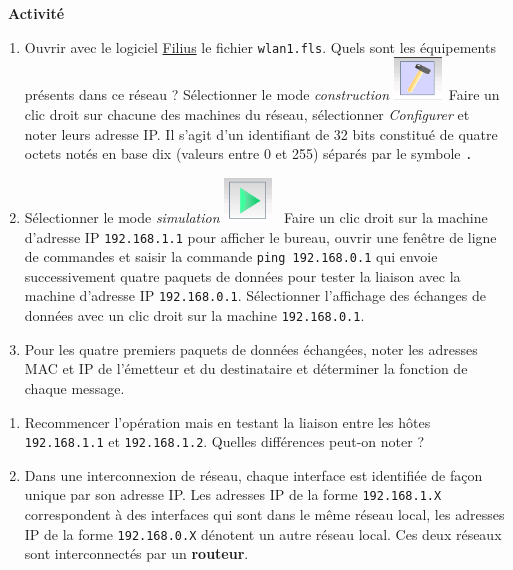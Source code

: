 \documentclass[
  11pt,
]{article}
\newcommand{\passthrough}[1]{#1}
\newcounter{activite}
\newenvironment{activite}[1]
{\par \medskip   \noindent   \addtocounter{activite}{1}
\begin{bclogo}[arrondi =0.1,   noborder = true, logo=\bcvelo, marge=4]{~\textbf{Activité} \textbf{\theactivite} {\itshape #1} }  \par}
{
\end{bclogo}
 \par \bigskip }
\newcounter{def}
\newcounter{logi}
\begin{document}
\begin{activite}{}

\begin{enumerate}
\def\labelenumi{\arabic{enumi}.}
\item
  Ouvrir avec le logiciel
  \href{https://www.lernsoftware-filius.de/Herunterladen}{Filius} le
  fichier \passthrough{\lstinline!wlan1.fls!}. Quels sont les
  équipements présents dans ce réseau ? Sélectionner le mode
  \emph{construction}
  \includegraphics[width=0.1\textwidth,height=\textheight]{images/filius-construction.png}~Faire
  un clic droit sur chacune des machines du réseau, sélectionner
  \emph{Configurer} et noter leurs adresse IP. Il s'agit d'un
  identifiant de 32 bits constitué de quatre octets notés en base dix
  (valeurs entre 0 et 255) séparés par le symbole
  \passthrough{\lstinline!.!}
\item
  Sélectionner le mode \emph{simulation}
  \includegraphics[width=0.1\textwidth,height=\textheight]{images/filius-simulation.png}~
  Faire un clic droit sur la machine d'adresse IP
  \passthrough{\lstinline!192.168.1.1!} pour afficher le bureau, ouvrir
  une fenêtre de ligne de commandes et saisir la commande
  \passthrough{\lstinline!ping 192.168.0.1!} qui envoie successivement
  quatre paquets de données pour tester la liaison avec la machine
  d'adresse IP \passthrough{\lstinline!192.168.0.1!}. Sélectionner
  l'affichage des échanges de données avec un clic droit sur la machine
  \passthrough{\lstinline!192.168.0.1!}.
\item
  Pour les quatre premiers paquets de données échangées, noter les
  adresses MAC et IP de l'émetteur et du destinataire et déterminer la
  fonction de chaque message.
\end{enumerate}

\begin{enumerate}
\def\labelenumi{\arabic{enumi}.}
\setcounter{enumi}{3}
\item
  Recommencer l'opération mais en testant la liaison entre les hôtes
  \passthrough{\lstinline!192.168.1.1!} et
  \passthrough{\lstinline!192.168.1.2!}. Quelles différences peut-on
  noter ?
\item
  Dans une interconnexion de réseau, chaque interface est identifiée de
  façon unique par son adresse IP. Les adresses IP de la forme
  \passthrough{\lstinline!192.168.1.X!} correspondent à des interfaces
  qui sont dans le même réseau local, les adresses IP de la forme
  \passthrough{\lstinline!192.168.0.X!} dénotent un autre réseau local.
  Ces deux réseaux sont interconnectés par un \textbf{routeur}.


\end{enumerate}
\end{activite}
\end{document}

